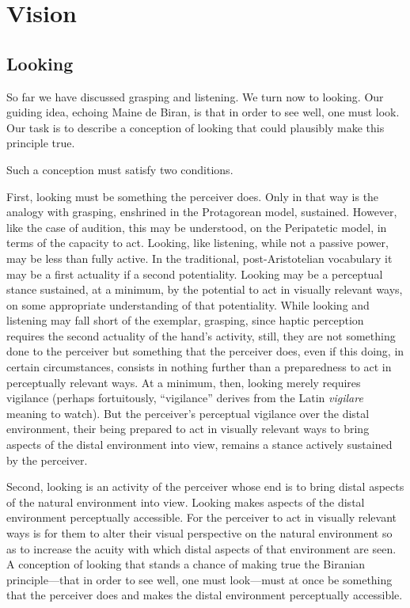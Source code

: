 \chapter{Vision} %
\label{cha:vision}

\section{Looking} %
\label{sec:looking}

So far we have discussed grasping and listening. We turn now to looking. Our guiding idea, echoing Maine de Biran, is that in order to see well, one must look. Our task is to describe a conception of looking that could plausibly make this principle true. 

Such a conception must satisfy two conditions. 

First, looking must be something the perceiver does. Only in that way is the analogy with grasping, enshrined in the Protagorean model, sustained. However, like the case of audition, this may be understood, on the Peripatetic model, in terms of the capacity to act. Looking, like listening, while not a passive power, may be less than fully active. In the traditional, post-Aristotelian vocabulary it may be a first actuality if a second potentiality. Looking may be a perceptual stance sustained, at a minimum, by the potential to act in visually relevant ways, on some appropriate understanding of that potentiality. While looking and listening may fall short of the exemplar, grasping, since haptic perception requires the second actuality of the hand's activity, still, they are not something done to the perceiver but something that the perceiver does, even if this doing, in certain circumstances, consists in nothing further than a preparedness to act in perceptually relevant ways. At a minimum, then, looking merely requires vigilance (perhaps fortuitously, ``vigilance'' derives from the Latin \emph{vigilare} meaning to watch). But the perceiver's perceptual vigilance over the distal environment, their being prepared to act in visually relevant ways to bring aspects of the distal environment into view, remains a stance actively sustained by the perceiver.

Second, looking is an activity of the perceiver whose end is to bring distal aspects of the natural environment into view. Looking makes aspects of the distal environment perceptually accessible. For the perceiver to act in visually relevant ways is for them to alter their visual perspective on the natural environment so as to increase the acuity with which distal aspects of that environment are seen. A conception of looking that stands a chance of making true the Biranian principle---that in order to see well, one must look---must at once be something that the perceiver does and makes the distal environment perceptually accessible. 

